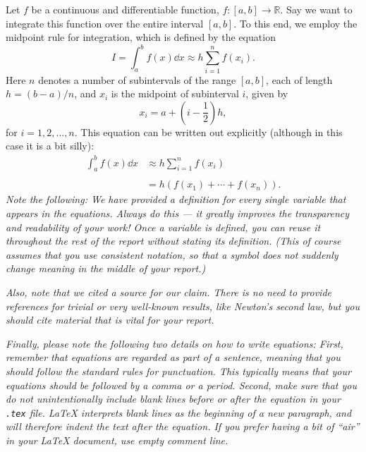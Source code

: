 \documentclass[english,notitlepage,reprint,nofootinbib]{revtex4-1}  %
\begin{document}
Let $f$ be a continuous and differentiable function, $f: [a,b] \to \mathbb{R}$. Say we want to integrate this function over the entire interval $[a,b]$. To this end, we employ the midpoint rule for integration, which is defined by the equation~\cite{midpoint_rule}
%
\begin{equation}
    I = \int_a^b f(x)\dd x \approx h\sum_{i=1}^{n} f(x_i).
\end{equation}
Here $n$ denotes a number of subintervals of the range $[a,b]$, each of length $h = (b-a)/n$, and $x_i$ is the midpoint of subinterval $i$, given by
\begin{equation}
   x_i = a + \left(i-\frac{1}{2}\right) h,
\end{equation}
for $i = 1, 2, \ldots, n$. This equation can be written out explicitly (although in this case it is a bit silly):
%
\begin{equation}
    \begin{split}
        \int_a^b f(x)\dd x & \approx h \sum_{i=1}^{n} f(x_i) \\
                                    \\
                                    & = h\left(f(x_1) + \cdots + f(x_{n})\right).
    \end{split}
\end{equation}
%
\textit{Note the following: We have provided a definition for every single variable that appears in the equations. Always do this --- it greatly improves the transparency and readability of your work! Once a variable is defined, you can reuse it throughout the rest of the report without stating its definition. (This of course assumes that you use consistent notation, so that a symbol does not suddenly change meaning in the middle of your report.)}

\textit{Also, note that we cited a source for our claim. There is no need to provide references for trivial or very well-known results, like Newton's second law, but you should cite material that is vital for your report.}

\textit{Finally, please note the following two details on how to write equations: First, remember that equations are regarded as part of a sentence, meaning that you should follow the standard rules for punctuation. This typically means that your equations should be followed by a comma or a period. Second, make sure that you do not unintentionally include blank lines before or after the equation in your \texttt{.tex} file. LaTeX interprets blank lines as the beginning of a new paragraph, and will therefore indent the text after the equation. If you prefer having a bit of ``air'' in your LaTeX document, use empty comment line.}
\end{document}
